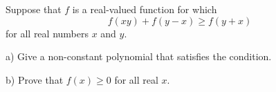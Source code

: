 Suppose that $ f$ is a real-valued function for which \[ f(xy)+f(y-x)\geq f(y+x)\]for all real numbers $ x$ and $ y$.

a) Give a non-constant polynomial that satisfies the condition.

b) Prove that $ f(x)\geq 0$ for all real $ x$.